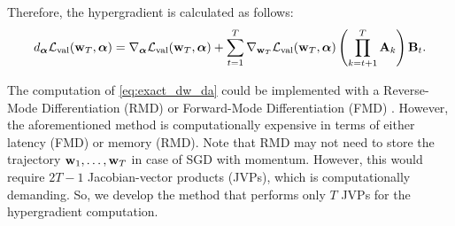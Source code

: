 Therefore, the hypergradient is calculated as follows:
\begin{align}\label{eq:hypergrad_full}
    d_{\boldsymbol{\mathbf{\alpha}}}\mathcal{L}_\text{val}(\boldsymbol{\mathbf{w}}_T, \boldsymbol{\mathbf{\alpha}}) = \nabla_{\boldsymbol{\mathbf{\alpha}}}\mathcal{L}_\text{val}(\boldsymbol{\mathbf{w}}_T, \boldsymbol{\mathbf{\alpha}}) + \sum_{t=1}^T \nabla_{\boldsymbol{\mathbf{w}}_T}\mathcal{L}_\text{val}(\boldsymbol{\mathbf{w}}_T, \boldsymbol{\mathbf{\alpha}})\left(\prod_{k=t+1}^T\boldsymbol{\mathbf{A}}_k\right)\boldsymbol{\mathbf{B}}_t.
\end{align}

The computation of \eqref{eq:exact_dw_da} could be implemented with a Reverse-Mode Differentiation (RMD) or Forward-Mode Differentiation (FMD) \cite{franceschi2017forward}. However, the aforementioned method is computationally expensive in terms of either latency (FMD) or memory (RMD). Note that RMD may not need to store the trajectory $\boldsymbol{\mathbf{w}}_1, \ldots, \boldsymbol{\mathbf{w}}_T$ in case of SGD with momentum. However, this would require $2T - 1$ Jacobian-vector products (JVPs), which is computationally demanding. So, we develop the method that performs only $T$ JVPs for the hypergradient computation.